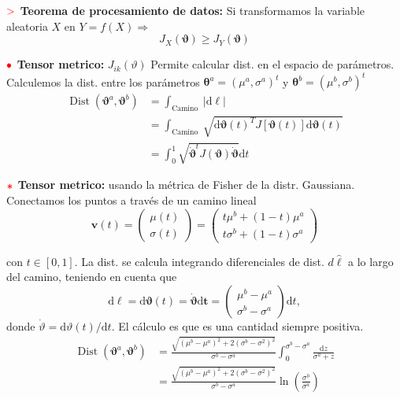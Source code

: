 \documentclass[%
 reprint,
 amsmath,amssymb,
 aps,
]{revtex4-1}
\begin{document}
\textbf{$\textcolor{red}{\mathbf{>}}$ Teorema de procesamiento de datos:}
Si transformamos la variable aleatoria $X$ en $Y=f(X) \Rightarrow$
$$
J_{X}(\boldsymbol{\vartheta}) \geq J_{Y}(\boldsymbol{\vartheta})
$$

\textbf{$\color{red}{\bullet}$ Tensor metrico:} $J_{ik}(\vartheta)$ Permite calcular dist. en el espacio de parámetros. Calculemos la dist.
entre los parámetros $\boldsymbol{\theta}^{a}=\left(\mu^{a}, \sigma^{a}\right)^{t}$ y $\boldsymbol{\theta}^{b}=\left(\mu^{b}, \sigma^{b}\right)^{t}$ 
$$
\begin{aligned}
\operatorname{Dist}\left(\boldsymbol{\vartheta}^{a}, \boldsymbol{\vartheta}^{b}\right) &=\int_{\text {Camino }}|\mathrm{d} \ell| \\
&=\int_{\text {Camino }} \sqrt{\mathrm{d} \boldsymbol{\vartheta}(t)^{T} J[\boldsymbol{\vartheta}(t)] \mathrm{d} \boldsymbol{\vartheta}(t)} \\
&=\int_{0}^{1} \sqrt{\dot{\boldsymbol{\vartheta}}^{t} J(\boldsymbol{\vartheta}) \dot{\boldsymbol{\vartheta}}} \mathrm{d} t
\end{aligned}
$$

\textbf{$\textcolor{red}{\color{red}{\boldsymbol{*}}}$ Tensor metrico:} 
usando la métrica de Fisher de la distr.
Gaussiana. Conectamos los puntos a través de un camino lineal
$$
\boldsymbol{v}(t)=\left(\begin{array}{c}
\mu(t) \\
\sigma(t)
\end{array}\right)=\left(\begin{array}{c}
t \mu^{b}+(1-t) \mu^{a} \\
t \sigma^{b}+(1-t) \sigma^{a}
\end{array}\right)
$$

con $t \in[0,1]$. La dist. se calcula integrando diferenciales
de dist. $d\hat{\ell}$ a lo largo del camino, teniendo en cuenta que
$$
\mathrm{d} \ell=\mathrm{d} \boldsymbol{\vartheta}(t)=\dot{\boldsymbol{\vartheta}} \mathrm{d} \boldsymbol{t}=\left(\begin{array}{c}
\mu^{b}-\mu^{a} \\
\sigma^{b}-\sigma^{a}
\end{array}\right) \mathrm{d} t,
$$
donde $\dot{\vartheta}=\mathrm{d} \vartheta(t) / \mathrm{d} t .$ El cálculo es
que es una cantidad siempre positiva. 
$$
\begin{aligned}
  \operatorname{Dist}\left(\boldsymbol{\vartheta}^{a}, \boldsymbol{\vartheta}^{b}\right) &=\frac{\sqrt{\left(\mu^{b}-\mu^{a}\right)^{2}+2\left(\sigma^{b}-\sigma^{2}\right)^{2}}}{\sigma^{b}-\sigma^{a}} \int_{0}^{\sigma^{b}-\sigma^{a}} \frac{\mathrm{d} z}{\sigma^{a}+z} \\
&=\frac{\sqrt{\left(\mu^{b}-\mu^{a}\right)^{2}+2\left(\sigma^{b}-\sigma^{2}\right)^{2}}}{\sigma^{b}-\sigma^{a}} \ln \left(\frac{\sigma^{b}}{\sigma^{a}}\right)
\end{aligned}
$$
\end{document}
